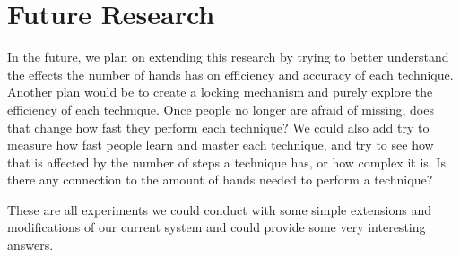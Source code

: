 \section{Future Research} \label{sec:futureresearch}
In the future, we plan on extending this research by trying to better understand the effects the number of hands has on efficiency and accuracy of each technique.
Another plan would be to create a locking mechanism and purely explore the efficiency of each technique. 
Once people no longer are afraid of missing, does that change how fast they perform each technique?
We could also add try to measure how fast people learn and master each technique, and try to see how that is affected by the number of steps a technique has, or how complex it is. 
Is there any connection to the amount of hands needed to perform a technique?

These are all experiments we could conduct with some simple extensions and modifications of our current system and could provide some very interesting answers.